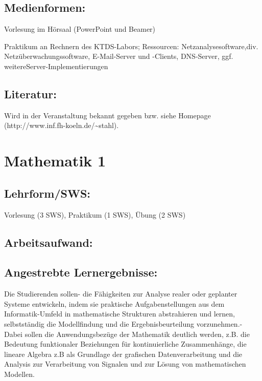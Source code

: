 \section{Medienformen:}\label{medienformen-12}

Vorlesung im Hörsaal (PowerPoint und Beamer)

Praktikum an Rechnern des KTDS-Labors; Ressourcen:
Netzanalysesoftware,div. Netzüberwachungssoftware, E-Mail-Server und
-Clients, DNS-Server, ggf. weitereServer-Implementierungen

\section{Literatur:}\label{literatur-12}

Wird in der Veranstaltung bekannt gegeben bzw. siehe Homepage
(http://www.inf.fh-koeln.de/\textasciitilde{}stahl).

\chapter{Mathematik 1}\label{mathematik-1}

\section{Lehrform/SWS:}\label{lehrformsws-13}

Vorlesung (3 SWS), Praktikum (1 SWS), Übung (2 SWS)

\section{Arbeitsaufwand:}\label{arbeitsaufwand-13}

\section{Angestrebte
Lernergebnisse:}\label{angestrebte-lernergebnisse-13}

Die Studierenden sollen- die Fähigkeiten zur Analyse realer oder
geplanter Systeme entwickeln, indem sie praktische Aufgabenstellungen
aus dem Informatik-Umfeld in mathematische Strukturen abstrahieren und
lernen, selbstständig die Modellfindung und die Ergebnisbeurteilung
vorzunehmen.- Dabei sollen die Anwendungsbezüge der Mathematik deutlich
werden, z.B. die Bedeutung funktionaler Beziehungen für kontinuierliche
Zusammenhänge, die lineare Algebra z.B als Grundlage der grafischen
Datenverarbeitung und die Analysis zur Verarbeitung von Signalen und zur
Lösung von mathematischen Modellen.

